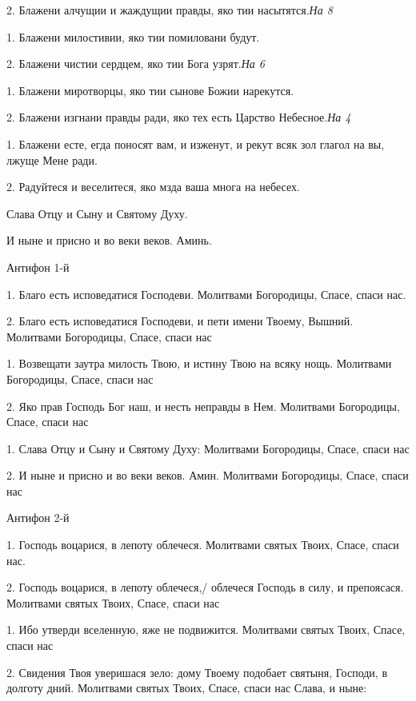 2. Блажени алчущии и жаждущии правды, яко тии насытятся.\itshape  На\normalfont{} 8 


1. Блажени милостивии, яко тии помиловани будут. 


2. Блажени чистии сердцем, яко тии Бога узрят.\itshape  На\normalfont{} 6 


1. Блажени миротворцы, яко тии сынове Божии нарекутся. 


2. Блажени изгнани правды ради, яко тех есть Царство Небесное.\itshape  На\normalfont{} 4 


1. Блажени есте, егда поносят вам, и изженут, и рекут всяк зол глагол на вы, лжуще Мене ради. 


2. Радуйтеся и веселитеся, яко мзда ваша многа на небесех. 


Слава Отцу и Сыну и Святому Духу. 


И ныне и присно и во веки веков. Аминь. 




Антифон 1-й 


1. Благо есть исповедатися Господеви. Молитвами Богородицы, Спасе, спаси нас. 


2. Благо есть исповедатися Господеви, и пети имени Твоему, Вышний. Молитвами Богородицы, Спасе, спаси нас 


1. Возвещати заутра милость Твою, и истину Твою на всяку нощь. Молитвами Богородицы, Спасе, спаси нас 


2. Яко прав Господь Бог наш, и несть неправды в Нем. Молитвами Богородицы, Спасе, спаси нас


1. Слава Отцу и Сыну и Святому Духу: Молитвами Богородицы, Спасе, спаси нас 


2. И ныне и присно и во веки веков. Амин. Молитвами Богородицы, Спасе, спаси нас

Антифон 2-й 


1. Господь воцарися, в лепоту облечеся. Молитвами святых Твоих, Спасе, спаси нас. 


2. Господь воцарися, в лепоту облечеся,/ облечеся Господь в силу, и препоясася. Молитвами святых Твоих, Спасе, спаси нас 


1. Ибо утверди вселенную, яже не подвижится. Молитвами святых Твоих, Спасе, спаси нас 


2. Свидения Твоя уверишася зело: дому Твоему подобает святыня, Господи, в долготу дний. Молитвами святых Твоих, Спасе, спаси нас Слава, и ныне:




